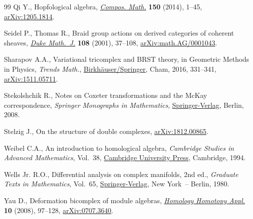 \documentclass[10pt,a4paper]{amsart}
\theoremstyle{definition}
\numberwithin{equation}{section}
\begin{document}
\begin{thebibliography}{99}
Qi Y., Hopfological algebra, \href{https://doi.org/10.1112/S0010437X13007380}{\textit{Compos. Math.}} \textbf{150} (2014), 1--45,
 \href{https://arxiv.org/abs/1205.1814}{arXiv:1205.1814}.

Seidel P., Thomas R., Braid group actions on derived categories of coherent
 sheaves, \href{https://doi.org/10.1215/S0012-7094-01-10812-0}{\textit{Duke Math.~J.}} \textbf{108} (2001), 37--108,
 \href{https://arxiv.org/abs/math.AG/0001043}{arXiv:math.AG/0001043}.

Sharapov A.A., Variational tricomplex and {BRST} theory, in Geometric Methods
 in Physics, \textit{Trends Math.}, \href{https://doi.org/10.1007/978-3-319-31756-4_26}{Birkh\"auser/Springer}, Cham, 2016, 331--341, \href{https://arxiv.org/abs/1511.05711}{arXiv:1511.05711}.

Stekolshchik R., Notes on {C}oxeter transformations and the {M}c{K}ay
 correspondence, \textit{Springer Monographs in Mathematics}, \href{https://doi.org/10.1007/978-3-540-77399-3}{Springer-Verlag}, Berlin,
 2008.

Stelzig J., On the structure of double complexes, \href{https://arxiv.org/abs/1812.00865}{arXiv:1812.00865}.

Weibel C.A., An introduction to homological algebra, \textit{Cambridge Studies
 in Advanced Mathematics}, Vol.~38, \href{https://doi.org/10.1017/CBO9781139644136}{Cambridge University Press}, Cambridge, 1994.

Wells Jr. R.O., Differential analysis on complex manifolds, 2nd ed., \textit{Graduate
 Texts in Mathematics}, Vol.~65, \href{https://doi.org/10.1007/978-0-387-73892-5}{Springer-Verlag}, New York~-- Berlin, 1980.

Yau D., Deformation bicomplex of module algebras, \href{https://doi.org/10.4310/HHA.2008.v10.n1.a5}{\textit{Homology Homotopy
 Appl.}} \textbf{10} (2008), 97--128, \href{https://arxiv.org/abs/0707.3640}{arXiv:0707.3640}.

\end{thebibliography}
\end{document}
